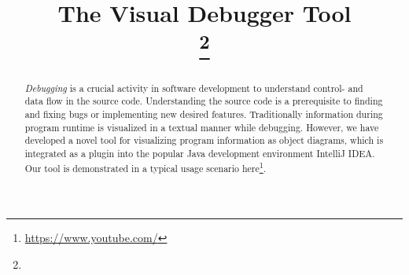 \documentclass[conference]{IEEEtran}
\newcommand{\intellij}{IntelliJ IDEA}
\newcommand{\screencast}{\url{https://www.youtube.com/}}
\begin{document}
\title{The Visual Debugger Tool\\
{}
\thanks{}
}

\author{
}

\maketitle


\begin{abstract}
\emph{Debugging} is a crucial activity in software development to understand control- and data flow in the source code.
Understanding the source code is a prerequisite to finding and fixing bugs or implementing new desired features. 
Traditionally information during program runtime is visualized in a textual manner while debugging.
However, we have developed a novel tool for visualizing program information as object diagrams, which is integrated as a plugin into the popular Java development environment \intellij{}.
Our tool is demonstrated in a typical usage scenario here\footnote{\screencast}.
\end{abstract}
\end{document}
